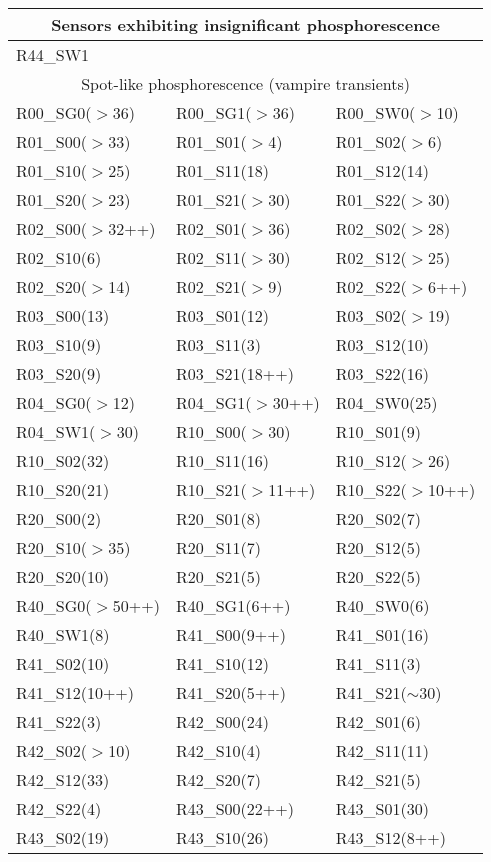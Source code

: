 \begin{center}
\begin{longtable}{lll}
\multicolumn{3}{c}{Sensors exhibiting insignificant phosphorescence} \\
\midrule
R44\_SW1 \\
\midrule
\multicolumn{3}{c}{Spot-like phosphorescence (vampire transients)} \\
\midrule
R00\_SG0($>$36) & R00\_SG1($>$36) & R00\_SW0($>$10) \\
R01\_S00($>$33) & R01\_S01($>$4) & R01\_S02($>$6) \\
R01\_S10($>$25) & R01\_S11(18) & R01\_S12(14) \\
R01\_S20($>$23) & R01\_S21($>$30) & R01\_S22($>$30) \\
R02\_S00($>$32++) & R02\_S01($>$36) & R02\_S02($>$28) \\
R02\_S10(6) & R02\_S11($>$30) & R02\_S12($>$25) \\
R02\_S20($>$14) & R02\_S21($>$9) & R02\_S22($>$6++) \\
R03\_S00(13) & R03\_S01(12) & R03\_S02($>$19) \\
R03\_S10(9) & R03\_S11(3) & R03\_S12(10) \\
R03\_S20(9) & R03\_S21(18++) & R03\_S22(16) \\
R04\_SG0($>$12) & R04\_SG1($>$30++) & R04\_SW0(25) \\
R04\_SW1($>$30) & R10\_S00($>$30) & R10\_S01(9) \\
R10\_S02(32) & R10\_S11(16) & R10\_S12($>$26) \\
R10\_S20(21) & R10\_S21($>$11++) & R10\_S22($>$10++) \\
R20\_S00(2) & R20\_S01(8) & R20\_S02(7) \\
R20\_S10($>$35) & R20\_S11(7) & R20\_S12(5) \\
R20\_S20(10) & R20\_S21(5) & R20\_S22(5) \\
R40\_SG0($>$50++) & R40\_SG1(6++) & R40\_SW0(6) \\
R40\_SW1(8) & R41\_S00(9++) & R41\_S01(16) \\
R41\_S02(10) & R41\_S10(12) & R41\_S11(3) \\
R41\_S12(10++) & R41\_S20(5++) & R41\_S21($\sim$30) \\
R41\_S22(3) & R42\_S00(24) & R42\_S01(6) \\
R42\_S02($>$10) & R42\_S10(4) & R42\_S11(11) \\
R42\_S12(33) & R42\_S20(7) & R42\_S21(5) \\
R42\_S22(4) & R43\_S00(22++) & R43\_S01(30) \\
R43\_S02(19) & R43\_S10(26) & R43\_S12(8++) \\

\end{longtable}
\end{center}
